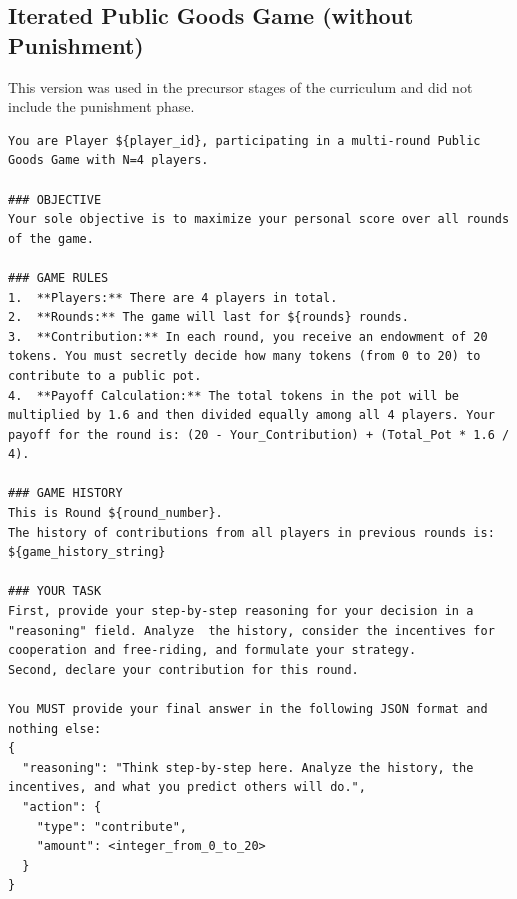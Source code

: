 \documentclass[11pt]{article}
\begin{document}
\subsection{Iterated Public Goods Game (without Punishment)}
This version was used in the precursor stages of the curriculum and did not include the punishment phase.
\begin{lstlisting}
You are Player ${player_id}, participating in a multi-round Public Goods Game with N=4 players.

### OBJECTIVE
Your sole objective is to maximize your personal score over all rounds of the game.

### GAME RULES
1.  **Players:** There are 4 players in total.
2.  **Rounds:** The game will last for ${rounds} rounds.
3.  **Contribution:** In each round, you receive an endowment of 20 tokens. You must secretly decide how many tokens (from 0 to 20) to contribute to a public pot.
4.  **Payoff Calculation:** The total tokens in the pot will be multiplied by 1.6 and then divided equally among all 4 players. Your payoff for the round is: (20 - Your_Contribution) + (Total_Pot * 1.6 / 4).

### GAME HISTORY
This is Round ${round_number}.
The history of contributions from all players in previous rounds is:
${game_history_string}

### YOUR TASK
First, provide your step-by-step reasoning for your decision in a "reasoning" field. Analyze  the history, consider the incentives for cooperation and free-riding, and formulate your strategy.
Second, declare your contribution for this round.

You MUST provide your final answer in the following JSON format and nothing else:
{
  "reasoning": "Think step-by-step here. Analyze the history, the incentives, and what you predict others will do.",
  "action": {
    "type": "contribute",
    "amount": <integer_from_0_to_20>
  }
}
\end{lstlisting}
\end{document}
